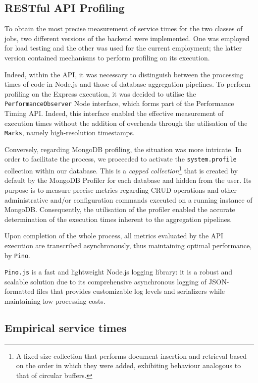 \subsection{RESTful API Profiling}

To obtain the most precise measurement of service times for the two classes of jobs, two different versions of the backend were implemented.
One was employed for load testing and the other was used for the current employment; the latter version contained mechanisms to perform profiling on its execution.

Indeed, within the API, it was necessary to distinguish between the processing times of code in Node.js and those of database aggregation pipelines.
To perform profiling on the Express execution, it was decided to utilise the \verb|PerformanceObserver| Node interface, which forms part of the Performance Timing API.
Indeed, this interface enabled the effective measurement of execution times without the addition of overheads through the utilisation of the \verb|Marks|, namely high-resolution timestamps.

Conversely, regarding MongoDB profiling, the situation was more intricate.
In order to facilitate the process, we proceeded to activate the \verb|system.profile| collection within our database. 
This is a \textit{capped collection}\footnote[1]{A fixed-size collection that performs document insertion and retrieval based on the order in which they were added, exhibiting behaviour analogous to that of circular buffers.} that is created by default by the MongoDB Profiler for each database and hidden from the user.
Its purpose is to measure precise metrics regarding CRUD operations and other administrative and/or configuration commands executed on a running instance of MongoDB.
Consequently, the utilisation of the profiler enabled the accurate determination of the execution times inherent to the aggregation pipelines.

Upon completion of the whole process, all metrics evaluated by the API execution are transcribed asynchronously, thus maintaining optimal performance, by \verb|Pino|.

\verb|Pino.js| is a fast and lightweight Node.js logging library: it is a robust and scalable solution due to its comprehensive asynchronous logging of JSON-formatted files that provides customizable log levels and serializers while maintaining low processing costs.

\subsection{Empirical service times}

